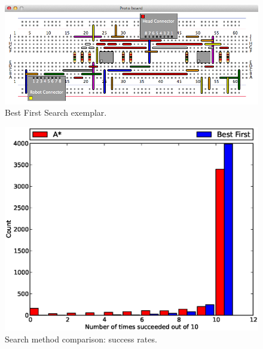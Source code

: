 \begin{figure}[H]
\begin{center}
\includegraphics[width=\textwidth]{Images/exemplar_best_first.png}
\caption{Best First Search exemplar.}
\end{center}
\end{figure}

\begin{figure}[H]
\begin{center}
\includegraphics[width=\textwidth]{Images/search_success_comparison.eps}
\caption{Search method comparison: success rates.}
\label{fig:search_success}
\end{center}
\end{figure}

